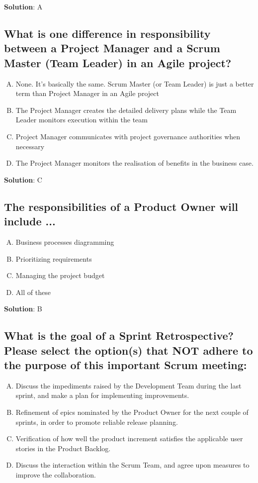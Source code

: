\textbf{Solution}: A


\subsection{What is one difference in responsibility between a Project Manager and a Scrum Master (Team Leader) in an Agile project?}
\begin{enumerate}[A)]
  \item None. It's basically the same. Scrum Master (or Team Leader) is just a better term than Project Manager in an Agile project
  \item The Project Manager creates the detailed delivery plans while the Team Leader monitors execution within the team
  \item Project Manager communicates with project governance authorities when necessary
  \item The Project Manager monitors the realisation of benefits in the business case.
\end{enumerate}

\textbf{Solution}: C


\subsection{The responsibilities of a Product Owner will include ...}


\begin{enumerate}[A)]
  \item Business processes diagramming
  \item Prioritizing requirements
  \item Managing the project budget
  \item All of these
\end{enumerate}

\textbf{Solution}: B


\subsection{What is the goal of a Sprint Retrospective? Please select the option(s) that NOT adhere to the purpose of this important Scrum meeting:}
\begin{enumerate}[A)]
  \item Discuss the impediments raised by the Development Team during the last sprint, and make a plan for implementing improvements.
  \item Refinement of epics nominated by the Product Owner for the next couple of sprints, in order to promote reliable release planning.
  \item Verification of how well the product increment satisfies the applicable user stories in the Product Backlog.
  \item Discuss the interaction within the Scrum Team, and agree upon measures to improve the collaboration.
\end{enumerate}

